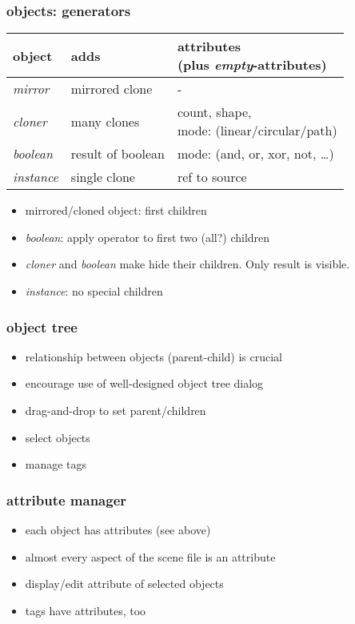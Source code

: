 \documentclass{beamer}
\begin{document}
\begin{frame}[t]\frametitle{objects: generators}
\begin{tabular}{lll}
\toprule
object          & adds              & \makecell[l]{attributes\\(plus \emph{empty}-attributes)}  \\
\midrule
\emph{mirror}   & mirrored clone    & -                                                         \\
\emph{cloner}   & many clones       & \makecell[l]{count, shape,\\mode: (linear/circular/path)} \\
\emph{boolean}  & result of boolean & mode: (and, or, xor, not, \dots)                          \\
\emph{instance} & single clone      & ref to source                                             \\
\bottomrule
\end{tabular}
\begin{itemize}
  \item mirrored/cloned object: first children
  \item \emph{boolean}: apply operator to first two (all?) children
  \item \emph{cloner} and \emph{boolean} make hide their children. Only result is visible.
  \item \emph{instance}: no special children
\end{itemize}
\end{frame}

\begin{frame}[t]\frametitle{object tree}
\begin{itemize}
  \item relationship between objects (parent-child) is crucial
  \item encourage use of well-designed object tree dialog
  \item drag-and-drop to set parent/children
  \item select objects
  \item manage tags
\end{itemize}
\end{frame}

\begin{frame}[t]\frametitle{attribute manager}
\begin{itemize}
  \item each object has attributes (see above)
  \item almost every aspect of the scene file is an attribute
  \item display/edit attribute of selected objects
  \item tags have attributes, too
\end{itemize}
\end{frame}
\end{document}
